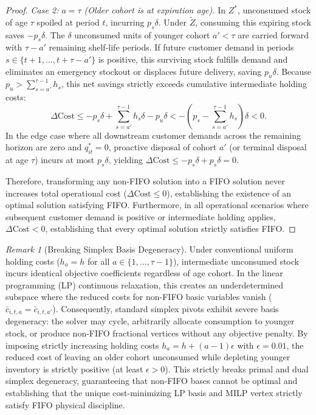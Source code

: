\documentclass[11pt,a4paper]{article}
\theoremstyle{definition}
\theoremstyle{remark}
\newtheorem{remark}{Remark}
\begin{document}
\begin{proof}
\textit{Case 2: $a = \tau$ (Older cohort is at expiration age).}
In $Z^*$, unconsumed stock of age $\tau$ spoiled at period $t$, incurring $p_s \delta$. Under $\tilde{Z}$, consuming this expiring stock saves $-p_s \delta$. The $\delta$ unconsumed units of younger cohort $a' < \tau$ are carried forward with $\tau - a'$ remaining shelf-life periods. If future customer demand in periods $s \in \{t+1, \dots, t+\tau-a'\}$ is positive, this surviving stock fulfills demand and eliminates an emergency stockout or displaces future delivery, saving $p_u \delta$. Because $p_u > \sum_{s=a'}^{\tau-1} h_s$, this net savings strictly exceeds cumulative intermediate holding costs:
\begin{equation*}
    \Delta \text{Cost} \le -p_s \delta + \sum_{s=a'}^{\tau-1} h_s \delta - p_u \delta < -\left(p_s - \sum_{s=a'}^{\tau-1} h_s\right) \delta < 0.
\end{equation*}
In the edge case where all downstream customer demands across the remaining horizon are zero and $q_{it}^* = 0$, proactive disposal of cohort $a'$ (or terminal disposal at age $\tau$) incurs at most $p_s \delta$, yielding $\Delta \text{Cost} \le -p_s \delta + p_s \delta = 0$. 

Therefore, transforming any non-FIFO solution into a FIFO solution never increases total operational cost ($\Delta \text{Cost} \le 0$), establishing the existence of an optimal solution satisfying FIFO. Furthermore, in all operational scenarios where subsequent customer demand is positive or intermediate holding applies, $\Delta \text{Cost} < 0$, establishing that every optimal solution strictly satisfies FIFO.
\end{proof}

\begin{remark}[Breaking Simplex Basis Degeneracy]
\label{rem:simplex_degeneracy}
Under conventional uniform holding costs ($h_a = h$ for all $a \in \{1, \dots, \tau-1\}$), intermediate unconsumed stock incurs identical objective coefficients regardless of age cohort. In the linear programming (LP) continuous relaxation, this creates an underdetermined subspace where the reduced costs for non-FIFO basic variables vanish ($\bar{c}_{i,t,a} = \bar{c}_{i,t,a'}$). Consequently, standard simplex pivots exhibit severe basis degeneracy: the solver may cycle, arbitrarily allocate consumption to younger stock, or produce non-FIFO fractional vertices without any objective penalty. By imposing strictly increasing holding costs $h_a = h + (a-1)\epsilon$ with $\epsilon = 0.01$, the reduced cost of leaving an older cohort unconsumed while depleting younger inventory is strictly positive (at least $\epsilon > 0$). This strictly breaks primal and dual simplex degeneracy, guaranteeing that non-FIFO bases cannot be optimal and establishing that the unique cost-minimizing LP basis and MILP vertex strictly satisfy FIFO physical discipline.
\end{remark}
\end{document}

